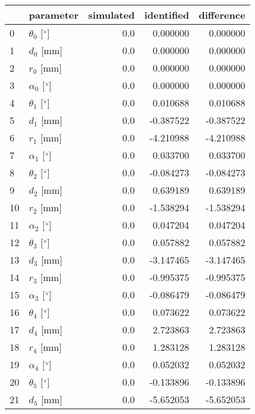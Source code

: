 \documentclass{standalone}%
\begin{document}
%
\normalsize%
\begin{tabular}{llrrr}
\toprule
{} &                 parameter & simulated & identified & difference \\
\midrule
0  &  $\theta_{0}$ [$\degree$] &       0.0 &   0.000000 &   0.000000 \\
1  &              $d_{0}$ [mm] &       0.0 &   0.000000 &   0.000000 \\
2  &              $r_{0}$ [mm] &       0.0 &   0.000000 &   0.000000 \\
3  &  $\alpha_{0}$ [$\degree$] &       0.0 &   0.000000 &   0.000000 \\
4  &  $\theta_{1}$ [$\degree$] &       0.0 &   0.010688 &   0.010688 \\
5  &              $d_{1}$ [mm] &       0.0 &  -0.387522 &  -0.387522 \\
6  &              $r_{1}$ [mm] &       0.0 &  -4.210988 &  -4.210988 \\
7  &  $\alpha_{1}$ [$\degree$] &       0.0 &   0.033700 &   0.033700 \\
8  &  $\theta_{2}$ [$\degree$] &       0.0 &  -0.084273 &  -0.084273 \\
9  &              $d_{2}$ [mm] &       0.0 &   0.639189 &   0.639189 \\
10 &              $r_{2}$ [mm] &       0.0 &  -1.538294 &  -1.538294 \\
11 &  $\alpha_{2}$ [$\degree$] &       0.0 &   0.047204 &   0.047204 \\
12 &  $\theta_{3}$ [$\degree$] &       0.0 &   0.057882 &   0.057882 \\
13 &              $d_{3}$ [mm] &       0.0 &  -3.147465 &  -3.147465 \\
14 &              $r_{3}$ [mm] &       0.0 &  -0.995375 &  -0.995375 \\
15 &  $\alpha_{3}$ [$\degree$] &       0.0 &  -0.086479 &  -0.086479 \\
16 &  $\theta_{4}$ [$\degree$] &       0.0 &   0.073622 &   0.073622 \\
17 &              $d_{4}$ [mm] &       0.0 &   2.723863 &   2.723863 \\
18 &              $r_{4}$ [mm] &       0.0 &   1.283128 &   1.283128 \\
19 &  $\alpha_{4}$ [$\degree$] &       0.0 &   0.052032 &   0.052032 \\
20 &  $\theta_{5}$ [$\degree$] &       0.0 &  -0.133896 &  -0.133896 \\
21 &              $d_{5}$ [mm] &       0.0 &  -5.652053 &  -5.652053 \\

\end{tabular}
\end{document}
